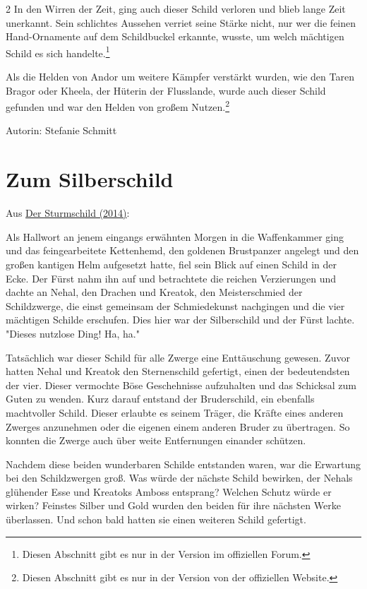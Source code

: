 \documentclass[10pt, a4paper, oneside]{book}
\newcommand{\storytext}[2][]{%
        \section{#2}%
        \label{storytext-#1}%
    }
\newcommand{\fillbreak}{\vspace*{\fill}\columnbreak}
\begin{document}
\begin{multicols}{2}
In den Wirren der Zeit, ging auch dieser Schild verloren und blieb lange Zeit unerkannt. Sein schlichtes Aussehen verriet seine Stärke nicht, nur wer die feinen Hand-Ornamente auf dem Schildbuckel erkannte, wusste, um welch mächtigen Schild es sich handelte.\footnote{Diesen Abschnitt gibt es nur in der Version im offiziellen Forum.}

Als die Helden von Andor um weitere Kämpfer verstärkt wurden, wie den Taren Bragor oder Kheela, der Hüterin der Flusslande, wurde auch dieser Schild gefunden und war den Helden von großem Nutzen.\footnote{Diesen Abschnitt gibt es nur in der Version von der offiziellen Website.}\bigskip

Autorin: Stefanie Schmitt



\fillbreak
\storytext[zum-silberschild]{Zum Silberschild}

\begin{center}
    Aus \hyperref[storytext-2014-der-sturmschild]{Der Sturmschild (2014)}:
\end{center}

Als Hallwort an jenem eingangs erwähnten Morgen in die Waffenkammer ging und das feingearbeitete Kettenhemd, den goldenen Brustpanzer angelegt und den großen kantigen Helm aufgesetzt hatte, fiel sein Blick auf einen Schild in der Ecke. Der Fürst nahm ihn auf und betrachtete die reichen Verzierungen und dachte an Nehal, den Drachen und Kreatok, den Meisterschmied der Schildzwerge, die einst gemeinsam der Schmiedekunst nachgingen und die vier mächtigen Schilde erschufen. Dies hier war der Silberschild und der Fürst lachte. "Dieses nutzlose Ding! Ha, ha."\bigskip

Tatsächlich war dieser Schild für alle Zwerge eine Enttäuschung gewesen. Zuvor hatten Nehal und Kreatok den Sternenschild gefertigt, einen der  bedeutendsten der vier. Dieser vermochte Böse Geschehnisse aufzuhalten  und das Schicksal zum Guten zu wenden. Kurz darauf entstand der Bruderschild, ein ebenfalls machtvoller Schild.  Dieser erlaubte es seinem Träger, die Kräfte eines anderen Zwerges anzunehmen oder die eigenen einem anderen Bruder zu übertragen. So konnten die Zwerge auch über weite Entfernungen einander schützen.\bigskip

Nachdem diese beiden wunderbaren Schilde entstanden waren, war die Erwartung bei den Schildzwergen groß. Was würde der nächste Schild bewirken, der Nehals glühender Esse und Kreatoks Amboss entsprang? Welchen Schutz würde er wirken? Feinstes Silber und Gold wurden den beiden für ihre nächsten Werke überlassen. Und schon bald hatten sie einen weiteren Schild gefertigt.


\end{multicols}
\end{document}
